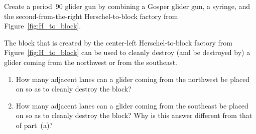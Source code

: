 \begin{multicols}{2}
	
	
	
	
	\mfilbreak
	
	
	\begin{problem}\label{exer:block_factory_is_tripler} 
		Create a period~90 glider gun by combining a Gosper glider gun, a syringe, and the second-from-the-right Herschel-to-block factory from Figure~\ref{fig:H_to_block}.
	\end{problem}
	
	
	\mfilbreak
	
	
	\begin{problem}\label{exer:block_factory_block_gliders} 
		The block that is created by the center-left Herschel-to-block factory from Figure~\ref{fig:H_to_block} can be used to cleanly destroy (and be destroyed by) a glider coming from the northwest or from the southeast.
		
		\begin{enumerate}[label=\bf\color{ocre}(\alph*)]
			\item How many adjacent lanes can a glider coming from the northwest be placed on so as to cleanly destroy the block?
			
			\item How many adjacent lanes can a glider coming from the southeast be placed on so as to cleanly destroy the block? Why is this answer different from that of part~(a)?
		\end{enumerate}
	\end{problem}
	

\end{multicols}
